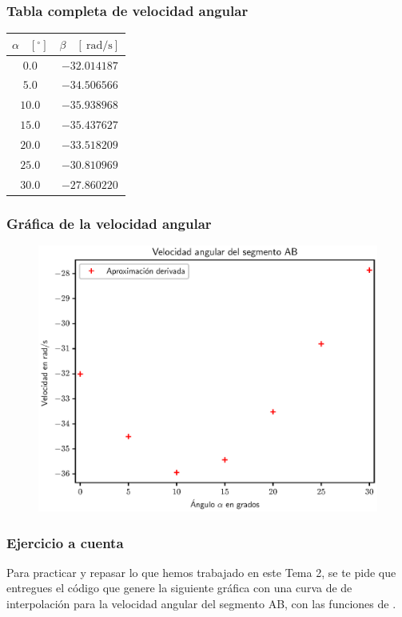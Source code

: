 \documentclass[12pt]{beamer}
\begin{document}
\begin{frame}
\frametitle{Tabla completa de velocidad angular}
\begin{table}
\centering
\renewcommand{\arraystretch}{0.9}
\begin{tabular}{c | c}
$\alpha$ \, $[{}^{\circ}]$ & $\beta$ \, $[\SI{}{\radian\per\second}]$ \\ \hline
$0.0$ & $-32.014187$ \\ \hline
$5.0$ & $-34.506566$ \\ \hline
$10.0$ & $-35.938968$ \\ \hline
$15.0$ & $-35.437627$ \\ \hline
$20.0$ & $-33.518209$ \\ \hline
$25.0$ & $-30.810969$ \\ \hline
$30.0$ & $-27.860220$ \\ \hline
\end{tabular}
\end{table}
\end{frame}
\begin{frame}
\frametitle{Gráfica de la velocidad angular}
\begin{figure}
    \centering
    \includegraphics[scale=0.55]{Imagenes/diferenciacion_ejercicio_segmento_01.eps}
\end{figure}
\end{frame}
\begin{frame}
\frametitle{Ejercicio a cuenta}
Para practicar y repasar lo que hemos trabajado en este Tema 2, se te pide que entregues el código que genere la siguiente gráfica con una curva de de interpolación para la velocidad angular del segmento AB, con las funciones de \python.
\end{frame}
\end{document}
